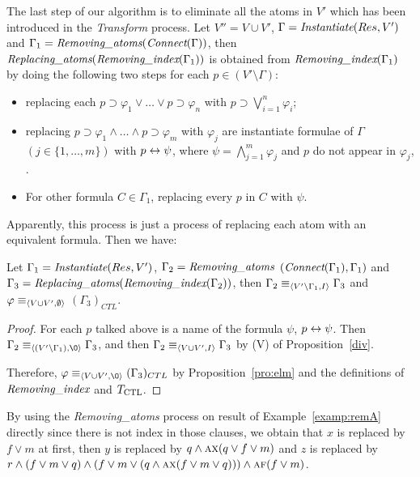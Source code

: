 \documentclass[letterpaper]{article} %
\begin{document}
The last step of our algorithm is to eliminate all the atoms in $V'$ which has been introduced in the \emph{Transform} process. Let $V''=V \cup V'$, $\Gamma=\emph{Instantiate}(Res, V')$ and $\Gamma_1=\emph{Removing\_atoms} (\emph{Connect}(\Gamma))$, then $\emph{Replacing\_atoms}(\emph{Removing\_index}(\Gamma_1))$ is obtained from $\emph{Removing\_index}(\Gamma_1)$ by doing the following two steps for each $p\in (V'\setminus \Gamma)$:
\begin{itemize}
  \item replacing each $p\supset \varphi_1\vee \dots \vee p \supset \varphi_n$ with $p \supset \bigvee_{i=1}^n \varphi_i$;
  \item replacing $p\supset \varphi_{1}\wedge \dots \wedge p \supset \varphi_{m}$ with $\varphi_j$ are instantiate formulae of  $\Gamma$ $(j \in \{1,\dots, m\})$ with $p \leftrightarrow \psi$, where $\psi=\bigwedge_{j=1}^{m} \varphi_{j}$ and $p$ do not appear in $\varphi_j$, .
  \item For other formula $C\in \Gamma_1$, replacing every $p$ in $C$ with $\psi$.
\end{itemize}
Apparently, this process is just a process of replacing each atom with an equivalent formula. Then we have:
\begin{proposition}\label{pro:replaceA}
Let $\Gamma_1=\emph{Instantiate}(Res, V')$, $\Gamma_2 =\emph{Removing\_atoms}$ $(\emph{Connect}(\Gamma_1), \Gamma_1)$ and $\Gamma_3 = \emph{Replacing\_atoms}(\emph{Removing\_index}(\Gamma_2))$, then $\Gamma_2  \equiv_{{\langle{V'\setminus \Gamma_1, I}\rangle}} \Gamma_3$ and $\varphi \equiv_{{\langle{V\cup V', \emptyset}\rangle}}$ $(\Gamma_3)_{CTL}$.
\end{proposition}
\begin{proof}
For each $p$ talked above is a name of the formula $\psi$, \ie $p \leftrightarrow \psi$.
Then $\Gamma_2  \equiv_{\tuple{(V'\setminus \Gamma_1), {\O}}} \Gamma_3$, and then $\Gamma_2 \equiv_{{\langle{V\cup V', I}\rangle}} \Gamma_3$  by (V) of Proposition~\ref{div}.

Therefore, $\varphi \equiv_{\tuple{V\cup V',{\O}}} (\Gamma_3)_{CTL}$ by Proposition~\ref{pro:elm} and the definitions of $\emph{Removing\_index}$ and $T_{\textrm{CTL}}$.
\end{proof}


\begin{example}\label{exa:replace:sub}
By using the \emph{Removing\_atoms} process on result of Example~\ref{examp:remA} directly since there is not index in those clauses, we obtain that $x$ is replaced by $f\vee m$ at first, then $y$ is replaced by $q \wedge \textsc{a}\textsc{x}(q \vee f\vee m)$ and $z$ is replaced by $r\wedge (f\vee m \vee q) \wedge (f\vee m \vee (q\wedge \textsc{a}\textsc{x}(f\vee m\vee q))) \wedge \textsc{a}\textsc{f}(f \vee m)$.
\end{example}
\end{document}
